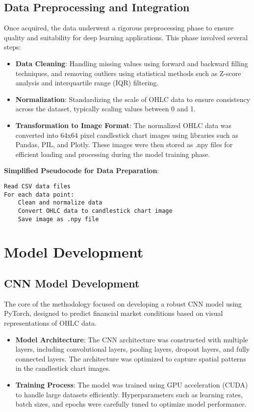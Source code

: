 \subsection{Data Preprocessing and Integration}

Once acquired, the data underwent a rigorous preprocessing phase to ensure quality and suitability for deep learning applications. This phase involved several steps:

\begin{itemize}
    \item \textbf{Data Cleaning}: Handling missing values using forward and backward filling techniques, and removing outliers using statistical methods such as Z-score analysis and interquartile range (IQR) filtering.
    \item \textbf{Normalization}: Standardizing the scale of OHLC data to ensure consistency across the dataset, typically scaling values between 0 and 1.
    \item \textbf{Transformation to Image Format}: The normalized OHLC data was converted into 64x64 pixel candlestick chart images using libraries such as Pandas, PIL, and Plotly. These images were then stored as .npy files for efficient loading and processing during the model training phase.
\end{itemize}

\textbf{Simplified Pseudocode for Data Preparation}:
\begin{verbatim}
Read CSV data files
For each data point:
    Clean and normalize data
    Convert OHLC data to candlestick chart image
    Save image as .npy file
\end{verbatim}

\section{Model Development}

\subsection{CNN Model Development}

The core of the methodology focused on developing a robust CNN model using PyTorch, designed to predict financial market conditions based on visual representations of OHLC data.

\begin{itemize}
    \item \textbf{Model Architecture}: The CNN architecture was constructed with multiple layers, including convolutional layers, pooling layers, dropout layers, and fully connected layers. The architecture was optimized to capture spatial patterns in the candlestick chart images.
    \item \textbf{Training Process}: The model was trained using GPU acceleration (CUDA) to handle large datasets efficiently. Hyperparameters such as learning rates, batch sizes, and epochs were carefully tuned to optimize model performance.
\end{itemize}

